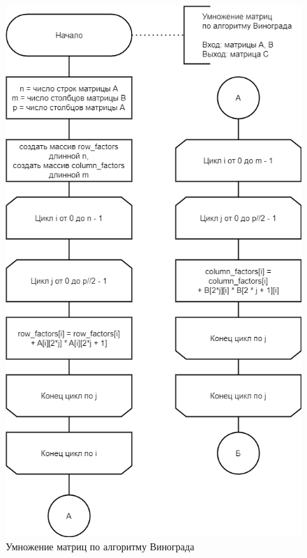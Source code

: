 \begin{figure}[H]
	\begin{center}
		\includegraphics[scale=0.6]{img/winograd1.png}
	\end{center}
	\captionsetup{justification=centering}
	\caption{Умножение матриц по алгоритму Винограда}
	\label{img:winograd1}
\end{figure}

